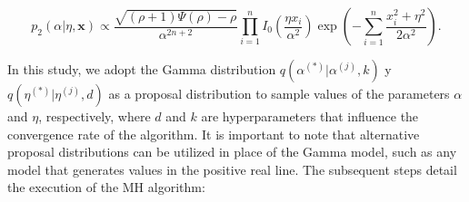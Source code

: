 \documentclass[12pt]{interact}
\theoremstyle{plain}%
\theoremstyle{definition}
\theoremstyle{remark}
\begin{document}
\begin{equation}\label{cond2}
p_2(\alpha|\eta,\boldsymbol{x})\propto\frac{\sqrt{(\rho+1)\Psi(\rho)-\rho}}{\alpha^{2n+2}}\prod_{i=1}^{n}I_0\left( \frac{\eta x_i}{\alpha^2} \right) \exp\left( -\sum_{i=1}^{n}\frac{x_i^2 + \eta^2}{2\alpha^2} \right).\end{equation}


In this study, we adopt the Gamma distribution $q(\alpha^{(*)}|\alpha^{(j)},k)$ y $q(\eta^{(*)}|\eta^{(j)},d)$ as a proposal distribution to sample values of the parameters $\alpha$ and $\eta$, respectively, where $d$ and $k$ are hyperparameters that influence the convergence rate of the algorithm. It is important to note that alternative proposal distributions can be utilized in place of the Gamma model, such as any model that generates values in the positive real line. The subsequent steps detail the execution of the MH algorithm:
\end{document}

